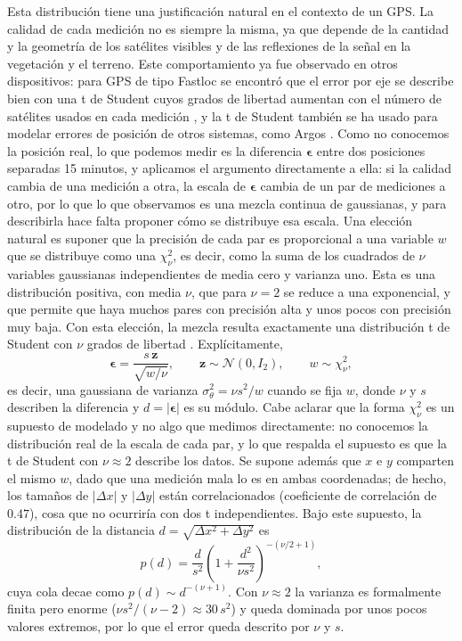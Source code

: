 Esta distribución tiene una justificación natural en el contexto de un GPS. La calidad de cada medición no es siempre la misma, 
ya que depende de la cantidad y la geometría de los satélites visibles y de las reflexiones de la señal en la vegetación y el terreno. Este comportamiento ya fue observado 
en otros dispositivos: para GPS de tipo Fastloc se encontró que el error por eje se describe bien con una t de Student cuyos grados de libertad aumentan con el número de satélites 
usados en cada medición \cite{wensveen2015}, y la t de Student también se ha usado para modelar errores de posición de otros sistemas, como Argos \cite{jonsen2005}. 
Como no conocemos la posición real, lo que podemos medir es la diferencia $\boldsymbol{\epsilon}$ entre dos posiciones separadas 15 minutos, y aplicamos el argumento directamente a ella: 
si la calidad cambia de una medición a otra, la escala de $\boldsymbol{\epsilon}$ cambia de un par de mediciones a otro, por lo que lo que observamos es una mezcla continua de gaussianas, 
y para describirla hace falta proponer cómo se distribuye esa escala. Una elección natural es suponer que la precisión de cada par es proporcional a una variable $w$ que se distribuye como una $\chi^2_\nu$, 
es decir, como la suma de los cuadrados de $\nu$ variables gaussianas independientes de media cero y varianza uno. Esta es una distribución positiva, con media $\nu$, que para $\nu=2$ se reduce 
a una exponencial, y que permite que haya muchos pares con precisión alta y unos pocos con precisión muy baja. Con esta elección, la mezcla resulta exactamente una distribución t de Student 
con $\nu$ grados de libertad \cite{lange1989}. Explícitamente,
\begin{equation}
    \boldsymbol{\epsilon}=\frac{s\,\mathbf{z}}{\sqrt{w/\nu}}, \qquad \mathbf{z}\sim\mathcal{N}(0,I_2), \qquad w\sim\chi^2_\nu ,
    \label{eq:error_t}
\end{equation}
es decir, una gaussiana de varianza $\sigma_\theta^2=\nu s^2/w$ cuando se fija $w$, donde $\nu$ y $s$ describen la diferencia y $d=|\boldsymbol{\epsilon}|$ es su módulo. Cabe aclarar que la forma $\chi^2_\nu$ 
es un supuesto de modelado y no algo que medimos directamente: no conocemos la distribución real de la escala de cada par, y lo que respalda el supuesto es que la t de Student con $\nu\approx2$ describe los datos. 
Se supone además que $x$ e $y$ comparten el mismo $w$, dado que una medición mala lo es en ambas coordenadas; de hecho, los tamaños de $|\Delta x|$ y $|\Delta y|$ están correlacionados 
(coeficiente de correlación de $0.47$), cosa que no ocurriría con dos t independientes. Bajo este supuesto, la distribución de la distancia $d=\sqrt{\Delta x^2+\Delta y^2}$ es
\begin{equation}
    p(d)=\frac{d}{s^2}\left(1+\frac{d^2}{\nu s^2}\right)^{-(\nu/2+1)},
    \label{eq:distancia_t}
\end{equation}
cuya cola decae como $p(d)\sim d^{-(\nu+1)}$. Con $\nu\approx2$ la varianza es formalmente finita pero enorme ($\nu s^2/(\nu-2)\approx30\,s^2$) y queda dominada 
por unos pocos valores extremos, por lo que el error queda descrito por $\nu$ y $s$.

